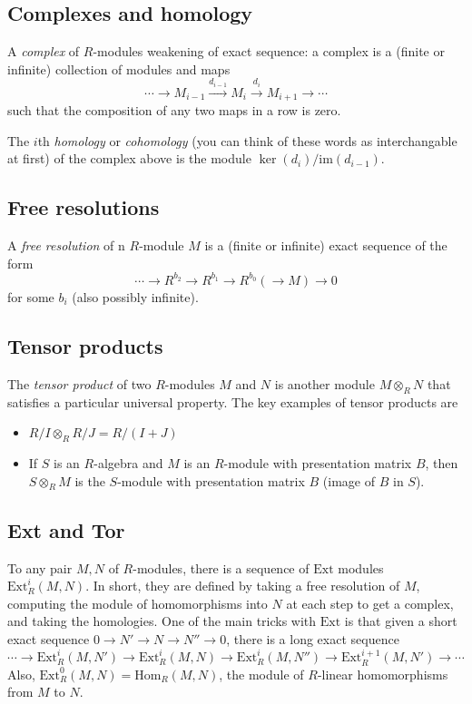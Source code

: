 \documentclass[12pt]{amsart}
\begin{document}
\subsection*{Complexes and homology} A \emph{complex} of $R$-modules weakening of exact sequence: a complex is a (finite or infinite) collection of modules and maps
\[ \cdots  \rightarrow M_{i-1} \xrightarrow{d_{i-1}} M_{i} \xrightarrow{d_{i}} M_{i+1} \rightarrow \cdots\]
such that the composition of any two maps in a row is zero.

The $i$th \emph{homology} or \emph{cohomology} (you can think of these words as interchangable at first) of the complex above is the module $\ker(d_i)/\mathrm{im}(d_{i-1})$.

\subsection*{Free resolutions} A \emph{free resolution} of n $R$-module $M$ is a (finite or infinite) exact sequence of the form
\[ \cdots\to  R^{b_2} \rightarrow R^{b_1} \rightarrow R^{b_0}(  \rightarrow M) \to 0\]
for some $b_i$ (also possibly infinite).

\subsection*{Tensor products} The \emph{tensor product} of two $R$-modules $M$ and $N$ is another module $M\otimes_R N$ that satisfies a particular universal property. The key examples of tensor products are
\begin{itemize} 
\item $R/I \otimes_R R/J = R/(I+J)$
\item If $S$ is an $R$-algebra and $M$ is an $R$-module with presentation matrix $B$, then $S\otimes_R M$ is the $S$-module with presentation matrix $B$ (image of $B$ in $S$).
\end{itemize}


\subsection*{Ext and Tor} To any pair $M,N$ of $R$-modules, there is a sequence of $\mathrm{Ext}$ modules $\mathrm{Ext}^i_R(M,N)$. In short, they are defined by taking a free resolution of $M$, computing the module of homomorphisms into $N$ at each step to get a complex, and taking the homologies. One of the main tricks with $\mathrm{Ext}$ is that given a short exact sequence $0\to N' \to N \to N'' \to 0$, there is a long exact sequence
\[ \cdots \to \mathrm{Ext}^i_R(M,N') \to \mathrm{Ext}^i_R(M,N) \to \mathrm{Ext}^i_R(M,N'') \to \mathrm{Ext}^{i+1}_R(M,N') \to \cdots\]
Also, $\mathrm{Ext}^0_R(M,N)=\mathrm{Hom}_R(M,N)$, the module of $R$-linear homomorphisms from $M$ to $N$.
\end{document}
